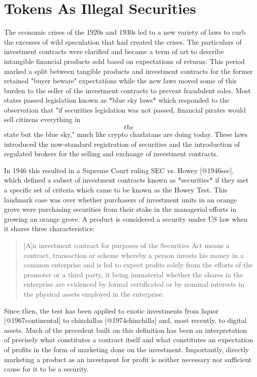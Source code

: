 \section{Tokens As Illegal Securities}


The economic crises of the 1920s and 1930s led to a new variety of laws to curb
the excesses of wild speculation that had created the crises. The particulars of
investment contracts were clarified and became a term of art to describe
intangible financial products sold based on expectations of returns. This period
marked a split between tangible products and investment contracts for the former
retained "buyer beware" expectations while the new laws moved some of this
burden to the seller of the investment contracts to prevent fraudulent sales.
Most states passed legislation known as *blue sky laws* which responded to the
observation that "if securities legislation was not passed, financial pirates
would sell citizens everything in \[the\] state but the blue sky," much like
crypto charlatans are doing today. These laws introduced the now-standard
registration of securities and the introduction of regulated brokers for the
selling and exchange of investment contracts.


In 1946 this resulted in a Supreme Court ruling SEC vs. Howey [@1946sec], which
defined a subset of investment contracts known as *securities* if they met a
specific set of criteria which came to be known as the Howey Test. This landmark
case was over whether purchasers of investment units in an orange grove were
purchasing securities from their stake in the managerial efforts in growing an
orange grove. A product is considered a security under US law when it shares
three characteristics:

\begin{quote}
{[}A{]}n investment contract for purposes of the Securities Act means a
contract, transaction or scheme whereby a person invests his money in a
common enterprise and is led to expect profits solely from the efforts
of the promoter or a third party, it being immaterial whether the shares
in the enterprise are evidenced by formal certificated or by nominal
interests in the physical assets employed in the enterprise.
\end{quote}

Since then, the test has been applied to exotic investments from liquor
[@1967continental] to chinchillas [@1974chinchilla] and, most recently, to
digital assets. Much of the precedent built on this definition has been an
interpretation of precisely what constitutes a contract itself and what
constitutes an expectation of profits in the form of marketing done on the
investment. Importantly, directly marketing a product as an investment for
profit is neither necessary nor sufficient cause for it to be a security.


